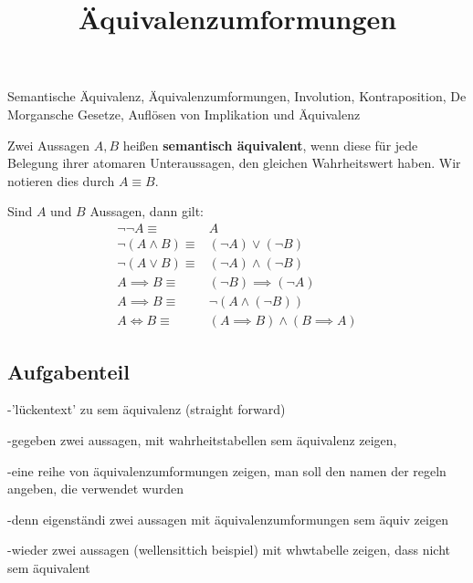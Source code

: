 \documentclass{uebungsblatt}
\title{Äquivalenzumformungen}
\begin{document}
\maketitle
\begin{contents}
    Semantische Äquivalenz, Äquivalenzumformungen, Involution, Kontraposition, De Morgansche Gesetze, Auflösen von Implikation und Äquivalenz
\end{contents}


\begin{definition}
    Zwei Aussagen $A,B$ heißen \textbf{semantisch äquivalent}, wenn diese für jede Belegung ihrer atomaren Unteraussagen, den gleichen Wahrheitswert haben. Wir notieren dies durch $A \equiv B$.
\end{definition}

\begin{theorem}
    Sind $A$ und $B$ Aussagen, dann gilt:
    \begin{align*}
        \tag{Involution}
        \lnot \lnot A \equiv& A\\
        \tag{1. De Morgansches Gesetz}
        \lnot (A \land B) \equiv& (\lnot A) \lor (\lnot B)\\
        \tag{2. De Morgansches Gesetz}
        \lnot (A \lor B) \equiv& (\lnot A) \land (\lnot B)\\
        \tag{Kontraposition}
        A \implies B \equiv& (\lnot B) \implies (\lnot A)\\
        \tag{Auflösen der Implikation}
        A \implies B \equiv & \lnot (A \land (\lnot B))\\
        \tag{Auflösen der Äquivalenz}
        A \iff B \equiv & (A \implies B) \land (B \implies A)
    \end{align*}
\end{theorem}

\subsection*{Aufgabenteil}

-'lückentext' zu sem äquivalenz (straight forward)

-gegeben zwei aussagen, mit wahrheitstabellen sem äquivalenz zeigen, 

-eine reihe von äquivalenzumformungen zeigen, man soll den namen der regeln angeben,
die verwendet wurden

-denn eigenständi zwei aussagen mit äquivalenzumformungen sem äquiv zeigen

-wieder zwei aussagen (wellensittich beispiel) mit whwtabelle zeigen, dass nicht
sem äquivalent


\end{document}
